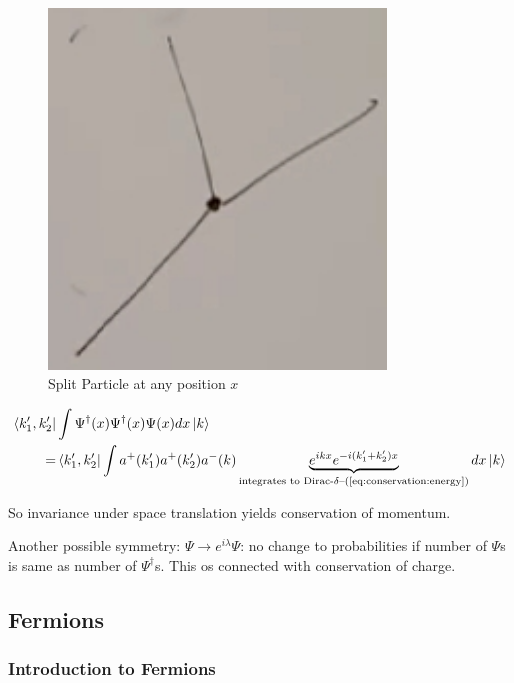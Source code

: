 \documentclass[]{article}
\begin{document}
\begin{figure}[H]
	\caption{Split Particle at any position $x$}\label{fig:split:particle}
	\includegraphics[width=0.8\textwidth]{split-particle1}
\end{figure}

\begin{align*}
\bra{k_1^\prime,k_2^\prime}&\int \Psi^\dagger(x)\Psi^\dagger(x)\Psi(x) dx\ket{k}\\
=&\bra{k_1^\prime,k_2^\prime}\int a^+(k_1^\prime) a^+(k_2^\prime) a^-(k) \underbrace{e^{ikx} e^{-i(k_1^\prime+k_2^\prime)x}}_\text{integrates to Dirac-$\delta$--(\ref{eq:conservation:energy})} dx\ket{k}
\end{align*}

So invariance under space translation yields conservation of momentum.

Another possible symmetry: $\Psi \rightarrow e^{i \lambda} \Psi$: no change to probabilities if number of $\Psi$s is same as number of $\Psi^\dagger$s. This os connected with conservation of charge.

\subsection{Fermions}

\subsubsection{Introduction to Fermions}
\end{document}

